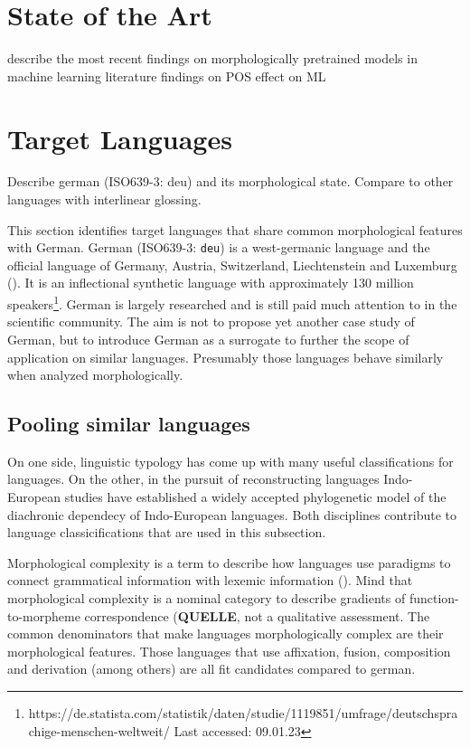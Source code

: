 \section{State of the Art}
\label{sec:state-of-the-art}
describe the most recent findings on morphologically pretrained models in machine learning literature
findings on POS effect on ML


\section{Target Languages}
\label{sec:target-languages}

Describe german (ISO639-3: deu) and its morphological state. Compare to other languages with interlinear glossing.

This section identifies target languages that share common morphological features with German.
German (ISO639-3: \texttt{deu}) is a west-germanic language and the official language of Germany, Austria, Switzerland, Liechtenstein and Luxemburg (\cite{METZLER2016}).
It is an inflectional synthetic language with approximately 130 million speakers\footnote{https://de.statista.com/statistik/daten/studie/1119851/umfrage/deutschsprachige-menschen-weltweit/ Last accessed: 09.01.23}.
German is largely researched and is still paid much attention to in the scientific community.
The aim is not to propose yet another case study of German, but to introduce German as a surrogate to further the scope of application on similar languages.
Presumably those languages behave similarly when analyzed morphologically.

\subsection{Pooling similar languages}
\label{subsec:german-as-example}



On one side, linguistic typology has come up with many useful classifications for languages.
On the other, in the pursuit of reconstructing languages Indo-European studies have established a widely accepted phylogenetic model of the diachronic dependecy of Indo-European languages.
Both disciplines contribute to language classicifications that are used in this subsection.

Morphological complexity is a term to describe how languages use paradigms to connect grammatical information with lexemic information (\cite{MORPHOLOGICALCOMPLEXITY}).
Mind that morphological complexity is a nominal category to describe gradients of function-to-morpheme correspondence (\textbf{QUELLE}, not a qualitative assessment.
The common denominators that make languages morphologically complex are their morphological features.
Those languages that use affixation, fusion, composition and derivation (among others) are all fit candidates compared to german.

